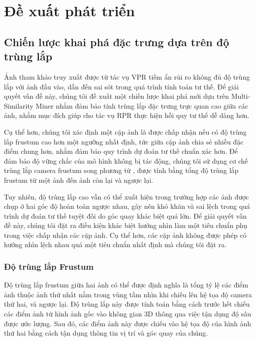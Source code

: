\section{Đề xuất phát triển}

\subsection{Chiến lược khai phá đặc trưng dựa trên độ trùng lắp}

Ảnh tham khảo truy xuất được từ tác vụ VPR tiềm ẩn rủi ro không đủ độ trùng lắp với ảnh đầu vào, dẫn đến sai sót trong quá trình tính toán tư thế. Để giải quyết vấn đề này, chúng tôi đề xuất một chiến lược khai phá mới dựa trên Multi-Similarity Miner \cite{wang2019multi} nhằm đảm bảo tính trùng lắp đặc trưng trực quan cao giữa các ảnh, nhằm mục đích giúp cho tác vụ RPR thực hiện hồi quy tư thế dễ dàng hơn. 

Cụ thể hơn, chúng tôi xác định một cặp ảnh là được chấp nhận nếu có độ trùng lắp frustum cao hơn một ngưỡng nhất định, tức giữa cặp ảnh chia sẻ nhiều đặc điểm chung hơn, nhằm đảm bảo quy trình dự đoán tư thế chuẩn xác hơn. Để đảm bảo độ vững chắc của mô hình không bị tác động, chúng tôi sử dụng cơ chế trùng lắp camera frustum song phương từ \cite{9008579}, được tính bằng tổng độ trùng lắp frustum từ một ảnh đến ảnh còn lại và ngược lại.

Tuy nhiên, độ trùng lắp cao vẫn có thể xuất hiện trong trường hợp các ảnh được chụp ở hai góc độ hoàn toàn ngược nhau, gây nên khó khăn và sai lệch trong quá trình dự đoán tư thế tuyệt đối do góc quay khác biệt quá lớn. Để giải quyết vấn đề này, chúng tôi đặt ra điều kiện khác biệt hướng nhìn làm một tiêu chuẩn phụ trong việc chấp nhận các cặp ảnh. Cụ thể hơn, các cặp ảnh không được phép có hướng nhìn lệch nhau quá một tiêu chuẩn nhất định mà chúng tôi đặt ra.

\subsubsection*{Độ trùng lắp Frustum}

Độ trùng lắp frustum giữa hai ảnh có thể được định nghĩa là tổng tỷ lệ các điểm ảnh thuộc ảnh thứ nhất nằm trong vùng tầm nhìn khi chiếu lên hệ tọa độ camera thứ hai, và ngược lại. Độ trùng lắp này được tính toán bằng cách trước hết chiếu các điểm ảnh từ hình ảnh gốc vào không gian 3D thông qua việc tận dụng độ sâu được ước lượng. Sau đó, các điểm ảnh này được chiếu vào hệ tọa độ của hình ảnh thứ hai bằng cách tận dụng thông tin vị trí và góc quay của chúng.

